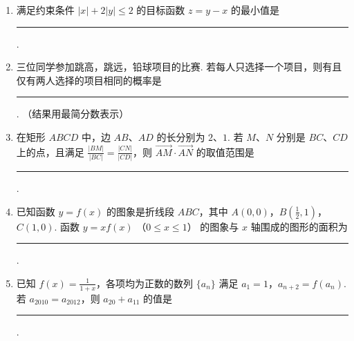 \begin{description}
\begin{enumerate}[leftmargin=5pt]
        \item 满足约束条件 \( |x| + 2|y| \leqslant 2 \) 的目标函数 \( z = y - x \) 的最小值是\rule[-0.3ex]{3em}{0.4pt}.

        \item 三位同学参加跳高，跳远，铅球项目的比赛. 若每人只选择一个项目，则有且仅有两人选择的项目相同的概率是\rule[-0.3ex]{3em}{0.4pt}. （结果用最简分数表示）

        \item 在矩形 \(ABCD\) 中，边 \(AB\)、\(AD\) 的长分别为 \(2\)、\(1\). 若 \(M\)、\(N\) 分别是 \(BC\)、\(CD\) 上的点，且满足 \(\frac{|BM|}{|BC|} = \frac{|CN|}{|CD|}\)，则 \(\overrightarrow{AM} \cdot \overrightarrow{AN}\) 的取值范围是\rule[-0.3ex]{3em}{0.4pt}.

        \item 已知函数 \( y = f(x) \) 的图象是折线段 \(ABC\)，其中 \(A(0,0)\)，\(B\left(\frac{1}{2}, 1\right)\)，\(C(1,0)\). 函数 \(y = xf(x)\) （\(0 \leqslant x \leqslant 1\)） 的图象与 \(x\) 轴围成的图形的面积为\rule[-0.3ex]{3em}{0.4pt}.

        \item 已知 \( f(x) = \frac{1}{1 + x} \)，各项均为正数的数列 \(\{a_n\}\) 满足 \(a_{1} = 1\)，\(a_{n + 2} = f(a_n)\). 若 \( a_{2010} = a_{2012} \)，则 \( a_{20} + a_{11} \) 的值是\rule[-0.3ex]{3em}{0.4pt}.

    \end{enumerate}

\end{description}

